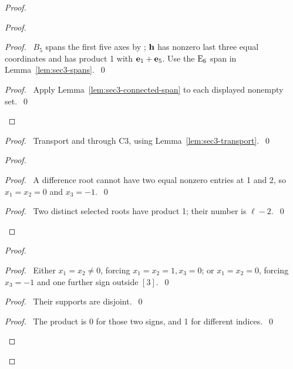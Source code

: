 \begin{proof}
\begin{proof}
  \begin{proof}\pf\ $B_5$ spans the first five axes by ;
   ${\mathbf h}$ has nonzero last three equal coordinates and has product 1 with
   ${\mathbf e}_1+{\mathbf e}_5$. Use the $\mathrm{E}_6$ span in Lemma~\ref{lem:sec3-spans}.~\qed\end{proof}
  \qedstep
  \begin{proof}\pf\ Apply Lemma~\ref{lem:sec3-connected-span} to each displayed nonempty set.~\qed\end{proof}
 \end{proof}
 \begin{proof}\pf\ Transport  and 
  through C3, using Lemma~\ref{lem:sec3-transport}.~\qed\end{proof}
 \begin{proof}
  \begin{proof}\pf\ A difference root cannot have two equal nonzero entries at 1 and 2,
   so $x_1=x_2=0$ and $x_3=-1$.~\qed\end{proof}
  \qedstep
  \begin{proof}\pf\ Two distinct selected roots have product 1; their number is $\ell-2$.~\qed\end{proof}
 \end{proof}
 \begin{proof}
  \begin{proof}\pf\ Either $x_1=x_2\ne0$, forcing $x_1=x_2=1,x_3=0$;
   or $x_1=x_2=0$, forcing $x_3=-1$ and one further sign outside $[3]$.~\qed\end{proof}
  \begin{proof}\pf\ Their supports are disjoint.~\qed\end{proof}
  \begin{proof}\pf\ The product is 0 for those two signs, and 1 for different indices.~\qed\end{proof}

\end{proof}
\end{proof}
